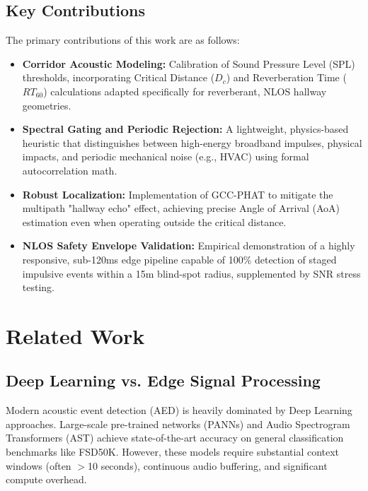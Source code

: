 \documentclass[conference]{IEEEtran}
\begin{document}
\subsection{Key Contributions}
The primary contributions of this work are as follows:
\begin{itemize}
    \item \textbf{Corridor Acoustic Modeling:} Calibration of Sound Pressure Level (SPL) thresholds, incorporating Critical Distance ($D_c$) and Reverberation Time ($RT_{60}$) calculations adapted specifically for reverberant, NLOS hallway geometries.
    \item \textbf{Spectral Gating and Periodic Rejection:} A lightweight, physics-based heuristic that distinguishes between high-energy broadband impulses, physical impacts, and periodic mechanical noise (e.g., HVAC) using formal autocorrelation math.
    \item \textbf{Robust Localization:} Implementation of GCC-PHAT to mitigate the multipath "hallway echo" effect, achieving precise Angle of Arrival (AoA) estimation even when operating outside the critical distance.
    \item \textbf{NLOS Safety Envelope Validation:} Empirical demonstration of a highly responsive, sub-120ms edge pipeline capable of 100\% detection of staged impulsive events within a 15m blind-spot radius, supplemented by SNR stress testing.
\end{itemize}

\section{Related Work}

\subsection{Deep Learning vs. Edge Signal Processing}
Modern acoustic event detection (AED) is heavily dominated by Deep Learning approaches. Large-scale pre-trained networks (PANNs) \cite{b22} and Audio Spectrogram Transformers (AST) \cite{b23} achieve state-of-the-art accuracy on general classification benchmarks like FSD50K. However, these models require substantial context windows (often $>$10 seconds), continuous audio buffering, and significant compute overhead. 
\end{document}
